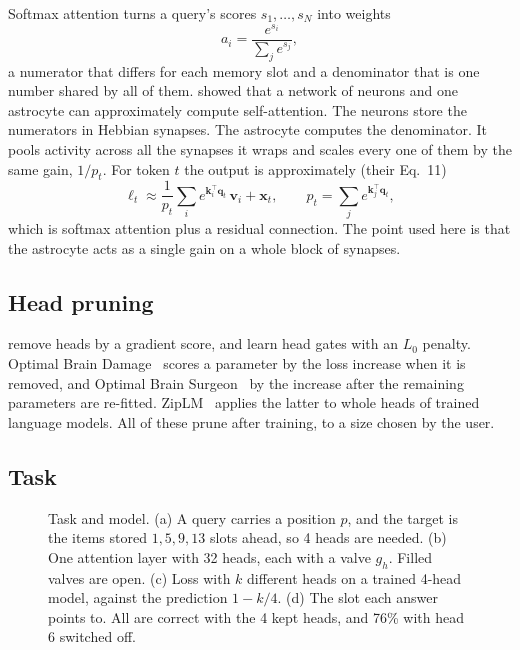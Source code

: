Softmax attention turns a query's scores $s_1,\dots,s_N$ into weights
\begin{equation}
  a_i = \frac{e^{s_i}}{\sum_j e^{s_j}} ,
\end{equation}
a numerator that differs for each memory slot and a denominator that is one number shared by all of them. \citet{kozachkov2023} showed that a network of neurons and one astrocyte can approximately compute self-attention. The neurons store the numerators in Hebbian synapses. The astrocyte computes the denominator. It pools activity across all the synapses it wraps and scales every one of them by the same gain, $1/p_t$. For token $t$ the output is approximately (their Eq.~11)
\begin{equation}
  \ell_t \approx \frac{1}{p_t} \sum_i e^{\bm k_i^{\top} \bm q_t}\, \bm v_i + \bm x_t,
  \qquad p_t = \sum_j e^{\bm k_j^{\top} \bm q_t},
\end{equation}
which is softmax attention plus a residual connection. The point used here is that the astrocyte acts as a single gain on a whole block of synapses.

\subsection{Head pruning}

\citet{michel2019sixteen} remove heads by a gradient score, and \citet{voita2019analyzing} learn head gates with an $L_0$ penalty. Optimal Brain Damage~\citep{obd} scores a parameter by the loss increase when it is removed, and Optimal Brain Surgeon~\citep{obs} by the increase after the remaining parameters are re-fitted. ZipLM~\citep{ziplm} applies the latter to whole heads of trained language models. All of these prune after training, to a size chosen by the user.

\subsection{Task}

\begin{figure}[t]
\centering
{}
\caption[Head-counting task and model]{Task and model.
(a) A query carries a position $p$, and the target is the items stored $1, 5, 9, 13$ slots ahead, so 4 heads are needed.
(b) One attention layer with 32 heads, each with a valve $g_h$. Filled valves are open.
(c) Loss with $k$ different heads on a trained 4-head model, against the prediction $1 - k/4$.
(d) The slot each answer points to. All are correct with the 4 kept heads, and 76\% with head 6 switched off.}
\label{fig:setup}
\end{figure}

